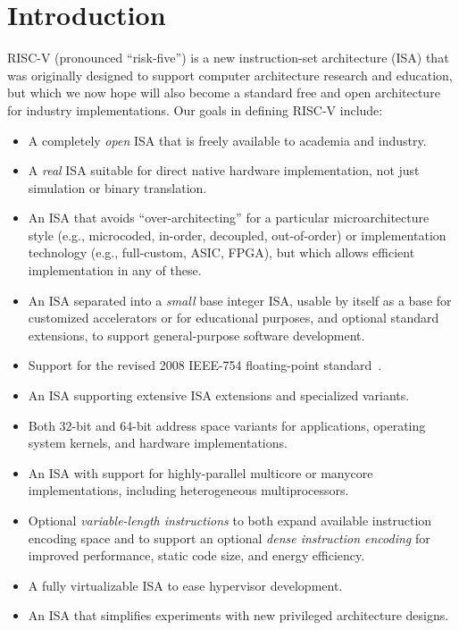 \chapter{Introduction}

RISC-V (pronounced ``risk-five'') is a new instruction-set
architecture (ISA) that was originally designed to support computer
architecture research and education, but which we now hope will also
become a standard free and open architecture for industry
implementations.  Our goals in defining RISC-V include:
\vspace{-0.1in}
\begin{itemize}
\parskip 0pt
\itemsep 1pt
\item A completely {\em open} ISA that is freely available to
  academia and industry.
\item A {\em real} ISA suitable for direct native hardware implementation,
  not just simulation or binary translation.
\item An ISA that avoids ``over-architecting'' for a particular
  microarchitecture style (e.g., microcoded, in-order, decoupled,
  out-of-order) or implementation technology (e.g., full-custom, ASIC,
  FPGA), but which allows efficient implementation in any of these.
\item An ISA separated into a {\em small} base integer ISA, usable by
  itself as a base for customized accelerators or for educational
  purposes, and optional standard extensions, to support
  general-purpose software development.
\item Support for the revised 2008 IEEE-754 floating-point standard~\cite{ieee754-2008}.
\item An ISA supporting extensive ISA extensions and
  specialized variants.
\item Both 32-bit and 64-bit address space variants for
  applications, operating system kernels, and hardware implementations.
\item An ISA with support for highly-parallel multicore
  or manycore implementations, including heterogeneous multiprocessors.
\item Optional {\em variable-length instructions} to both expand available
  instruction encoding space and to support an optional {\em dense
  instruction encoding} for improved performance, static code size,
  and energy efficiency.
\item A fully virtualizable ISA to ease hypervisor development.
\item An ISA that simplifies experiments with new privileged architecture designs.
\end{itemize}
\vspace{-0.1in}

